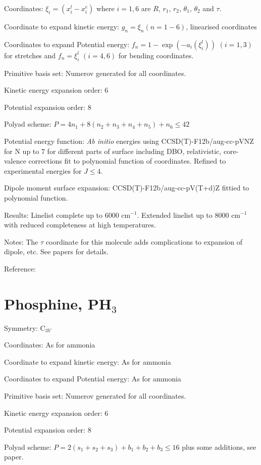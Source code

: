 Coordinates: $\xi_i = (x_i^l - x_i^e)$ where $i = 1, 6$ are $R$, $r_1$, $r_2$, $\theta_1$, $\theta
_2$ and $\tau$. 

Coordinate to expand kinetic energy: $g_n = \xi_n (n=1-6)$, linearised coordinates

Coordinates to expand Potential energy: $f_n = 1 - \exp(-a_i(\xi_i^l))$ $(i = 1, 3)$ for stretches and 
$f_n = \xi_i^l$ $(i = 4, 6)$ for bending coordinates. 

Primitive basis set: Numerov generated for all coordinates.

Kinetic energy expansion order: 6

Potential expansion order: 8

Polyad scheme: $P = 4n_1 + 8(n_2 + n_3 + n_4 + n_5) +n_6 \leq 42$

Potential energy function: \textit{Ab initio} energies using CCSD(T)-F12b/aug-cc-pVNZ for N up to 7 
for different parts of surface including DBO, relativistic, core-valence corrections fit to polynomial function 
of coordinates. Refined to experimental energies for $J \leq 4$.

Dipole moment surface expansion:  CCSD(T)-F12b/aug-cc-pV(T+d)Z fittied to polynomial function.


Results:  Linelist complete up to 6000 cm$^{-1}$. Extended linelist up to 8000 cm$^{-1}$ with reduced completeness
at high temperatures.

Notes: The $\tau$ coordinate for this molecule adds complications to expansion of dipole, etc. See papers for details.

Reference: \cite{jt553,jt620,jt638}



\section{Phosphine, PH$_3$}

Symmetry: C$_{3V}$

Coordinates: As for ammonia

Coordinate to expand kinetic energy: As for ammonia

Coordinates to expand Potential energy: As for ammonia

Primitive basis set: Numerov generated for all coordinates.

Kinetic energy expansion order: 6

Potential expansion order: 8

Polyad scheme: $P = 2(s_1 + s_2 + s_3) + b_1 + b_2 + b_3 \leq 16$ plus some additions, see paper.

